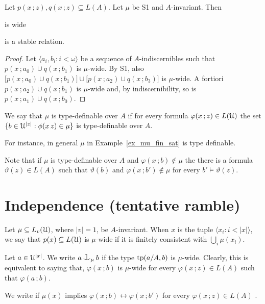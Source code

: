 \documentclass{amsproc}
\renewcommand*{\emph}[1]{%
   \smash{\tikz[baseline]\node[rectangle, fill=teal!25, rounded corners, inner xsep=0.5ex, inner ysep=0.2ex, anchor=base, minimum height = 2.7ex]{\strut #1};}}
\def\cnonfork{\mathbin{\raise1.8ex\rlap{\kern0.6ex\rule{0.6ex}{0.1ex}}\rlap{\kern1.1ex\rule{0.1ex}{1.9ex}}\raise-0.3ex\hbox{$\smile$} } }
\begin{document}
\begin{theorem}
  Let $p(x\,;z), q(x\,;z)\subseteq L(A)$.
  Let $\mu$ be S1 and $A$-invariant.
  Then 

   is wide

  is a stable relation.
\end{theorem}

\begin{proof}
  Let $\langle a_i,b_i: i<\omega\rangle$ be a sequence of $A$-indiscernibles such that $p(x\,;a_0)\cup q(x\,;b_1)$ is $\mu$-wide.
  By S1, also $\big[p(x\,;a_0)\cup q(x\,;b_1)\big]\cup\big[p(x\,;a_2)\cup q(x\,;b_3)\big]$ is $\mu$-wide.
  A fortiori $p(x\,;a_2)\cup q(x\,;b_1)$ is $\mu$-wide and, by indiscernibility, so is $p(x\,;a_1)\cup q(x\,;b_0)$.
\end{proof}

\begin{definition}
  We say that $\mu$ is type-definable over $A$ if for every formula $\varphi(x\,;z)\in L(\EuScript U)$ the set $\{b\in\EuScript U^{|z|} : \phi(x\,z)\in\mu\}$ is type-definable over $A$.
\end{definition}

For instance, in general $\mu$ in Example~\ref{ex_mu_fin_sat} is type definable.

Note that if $\mu$ is type-definable over $A$ and $\varphi(x\,;b)\notin\mu$ the there is a formula $\vartheta(z)\in L(A)$ such that $\vartheta(b)$ and $\varphi(x\,;b')\notin\mu$ for every $b'\models\vartheta(z)$.

\section{Independence (tentative ramble)}

Let $\mu\subseteq L_v(\EuScript U)$, where $|v|=1$, be $A$-invariant.
When $x$ is the tuple $\langle x_i:i<|x|\rangle$, we say that $p(x)\subseteq L(\EuScript U)$ is $\mu$-wide if it is finitely consistent with $\bigcup_i\mu(x_i)$.

Let $a\in\EuScript U^{|x|}$.
We write $a\cnonfork_\mu b$ if the type ${\rm tp}(a/A,b)$ is $\mu$-wide. 
Clearly, this is equivalent to saying that,  $\varphi(x\,;b)$ is $\mu$-wide for every $\varphi(x\,;z)\in L(A)$ such that $\varphi(a\,;b)$.

We write\emph{$b\equiv_\mu b'$\/} if $\mu(x)$ implies $\varphi(x\,;b)\leftrightarrow\varphi(x\,;b')$ for every $\varphi(x\,;z)\in L(A)$
.
\end{document}
